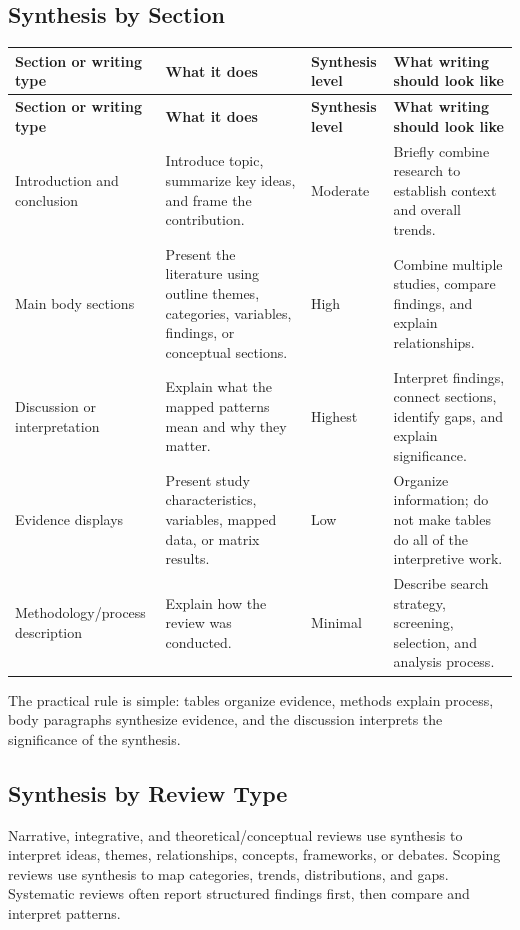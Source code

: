 \documentclass[10pt,letterpaper]{article}
\begin{document}
\subsection{Synthesis by Section}

\begin{longtable}{L{3.3cm} L{4.3cm} L{2.1cm} L{4.0cm}}
\toprule
{}
\textbf{Section or writing type} & \textbf{What it does} & \textbf{Synthesis level} & \textbf{What writing should look like}\\
\midrule
\endfirsthead
\toprule
{}
\textbf{Section or writing type} & \textbf{What it does} & \textbf{Synthesis level} & \textbf{What writing should look like}\\
\midrule
\endhead
\bottomrule
\endfoot
Introduction and conclusion & Introduce topic, summarize key ideas, and frame the contribution. & Moderate & Briefly combine research to establish context and overall trends.\\
Main body sections & Present the literature using outline themes, categories, variables, findings, or conceptual sections. & High & Combine multiple studies, compare findings, and explain relationships.\\
Discussion or interpretation & Explain what the mapped patterns mean and why they matter. & Highest & Interpret findings, connect sections, identify gaps, and explain significance.\\
Evidence displays & Present study characteristics, variables, mapped data, or matrix results. & Low & Organize information; do not make tables do all of the interpretive work.\\
Methodology/process description & Explain how the review was conducted. & Minimal & Describe search strategy, screening, selection, and analysis process.\\
\end{longtable}

The practical rule is simple: tables organize evidence, methods explain process, body paragraphs synthesize evidence, and the discussion interprets the significance of the synthesis.

\subsection{Synthesis by Review Type}

Narrative, integrative, and theoretical/conceptual reviews use synthesis to interpret ideas, themes, relationships, concepts, frameworks, or debates. Scoping reviews use synthesis to map categories, trends, distributions, and gaps. Systematic reviews often report structured findings first, then compare and interpret patterns.
\end{document}
